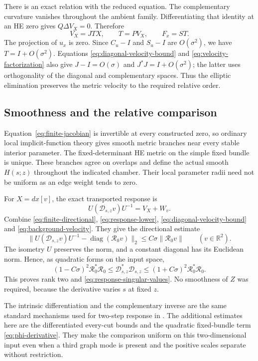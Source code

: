 \documentclass[11pt]{amsart}
\theoremstyle{definition}
\theoremstyle{remark}
\newcommand{\RR}{\mathbb R}
\newcommand{\diag}{\operatorname{diag}}
\newcommand{\cR}{\mathcal R}
\newcommand{\cD}{\mathscr D}
\begin{document}
There is an exact relation with the reduced equation. The complementary
curvature vanishes throughout the ambient family. Differentiating that
identity at an HE zero gives $Q\Delta V_X=0$. Therefore
\begin{equation}\label{eq:velocity-factorization}
 V_X=JTX,\qquad T=PV_X,\qquad F_x=ST.
\end{equation}
The projection of $u_x$ is zero. Since $C_u-I$ and $S_u-I$ are
$O(\sigma^2)$, we have $T=I+O(\sigma^2)$. Equations
\eqref{eq:diagonal-velocity-bound} and \eqref{eq:velocity-factorization}
also give $J-I=O(\sigma)$ and $J^*J=I+O(\sigma^2)$; the latter
uses orthogonality of the diagonal and complementary spaces. Thus the
elliptic elimination preserves the metric velocity to the required
relative order.

\subsection{Smoothness and the relative comparison}
Equation~\eqref{eq:finite-jacobian} is invertible at every constructed zero,
so ordinary local implicit-function theory gives smooth metric branches
near every stable interior parameter. The fixed-determinant HE metric on
the simple fixed bundle is unique. These branches agree on overlaps and
define the actual smooth $H(s;z)$ throughout the indicated chamber. Their
local parameter radii need not be uniform as an edge weight tends to zero.

For $X=dx[v]$, the exact transported response is
\[
 U(\cD_{s,z}v)U^{-1}=V_X+W_v.
\]
Combine \eqref{eq:finite-directional}, \eqref{eq:response-lower},
\eqref{eq:diagonal-velocity-bound} and \eqref{eq:background-velocity}.
They give the directional estimate
\begin{equation}\label{eq:actual-directional}
 \bigl\|U(\cD_{s,z}v)U^{-1}-\diag(\cR_0v)\bigr\|_2
 \le C\sigma\|\cR_0v\|\qquad(v\in\RR^2).
\end{equation}
The isometry $U$ preserves the norm, and a constant diagonal has its
Euclidean norm. Hence, as quadratic forms on the input space,
\[
 (1-C\sigma)^2\cR_0^*\cR_0
 \le\cD_{s,z}^*\cD_{s,z}
 \le(1+C\sigma)^2\cR_0^*\cR_0.
\]
This proves rank two and \eqref{eq:response-singular-values}. No smoothness
of $Z$ was required, because the derivative varies $s$ at fixed $z$.

The intrinsic differentiation and the complementary inverse are the same
standard mechanisms used for two-step response in \cite{wuebben2026response}.
The additional estimates here are the differentiated every-cut bounds and
the quadratic fixed-bundle term \eqref{eq:phi-derivative}. They make the
comparison uniform on this two-dimensional input even when a third graph
mode is present and the positive scales separate without restriction.
\end{document}
